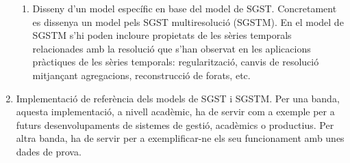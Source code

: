 \begin{enumerate}
\begin{enumerate}
  \item Disseny d'un model específic en base del model de
    SGST. Concretament es dissenya un model pels SGST multiresolució
    (SGSTM).  En el model de SGSTM s'hi poden incloure propietats de
    les sèries temporals relacionades amb la resolució que s'han
    observat en les aplicacions pràctiques de les sèries temporals:
    regularització, canvis de resolució mitjançant agregacions,
    reconstrucció de forats, etc.
  \end{enumerate}

\item Implementació de referència dels models de SGST i SGSTM. Per una
  banda, aquesta implementació, a nivell acadèmic, ha de servir com a
  exemple per a futurs desenvolupaments de sistemes de gestió,
  acadèmics o productius. Per altra banda, ha de servir per a
  exemplificar-ne els seu funcionament amb unes dades de prova.



\end{enumerate} 








